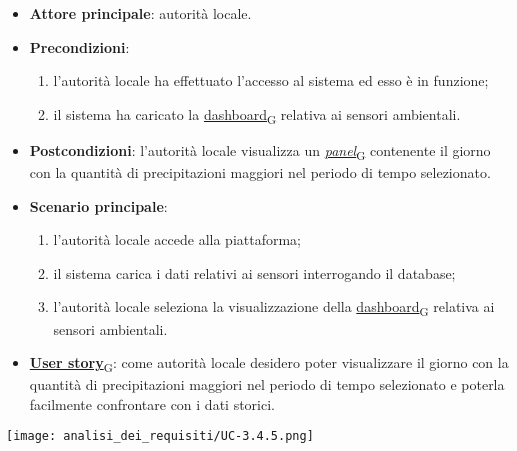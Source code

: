 \begin{itemize}
	\item \textbf{Attore principale}: autorità locale.
	\item \textbf{Precondizioni}:
	      \begin{enumerate}
		      \item l'autorità locale ha effettuato l'accesso al sistema ed esso è in funzione;
		      \item il sistema ha caricato la \href{https://7last.github.io/docs/pb/documentazione-interna/glossario\#dashboard}{dashboard\textsubscript{G}} relativa ai sensori ambientali.
	      \end{enumerate}
	\item \textbf{Postcondizioni}: l'autorità locale visualizza un \href{https://7last.github.io/docs/pb/documentazione-interna/glossario\#panel}{\textit{panel}\textsubscript{G}} contenente il giorno con la quantità di precipitazioni maggiori nel periodo di tempo selezionato.
	\item \textbf{Scenario principale}:
	      \begin{enumerate}
		      \item l'autorità locale accede alla piattaforma;
		      \item il sistema carica i dati relativi ai sensori interrogando il database;
		      \item l'autorità locale seleziona la visualizzazione della \href{https://7last.github.io/docs/pb/documentazione-interna/glossario\#dashboard}{dashboard\textsubscript{G}} relativa ai sensori ambientali.
	      \end{enumerate}
	\item \href{https://7last.github.io/docs/pb/documentazione-interna/glossario\#user-story}{\textbf{User story}\textsubscript{G}}:
	      come autorità locale desidero poter visualizzare il giorno con la quantità di precipitazioni maggiori nel periodo di tempo selezionato
	      e poterla facilmente confrontare con i dati storici.
\end{itemize}
\begin{center}
	\texttt{[image: analisi\_dei\_requisiti/UC-3.4.5.png]}
\end{center}


